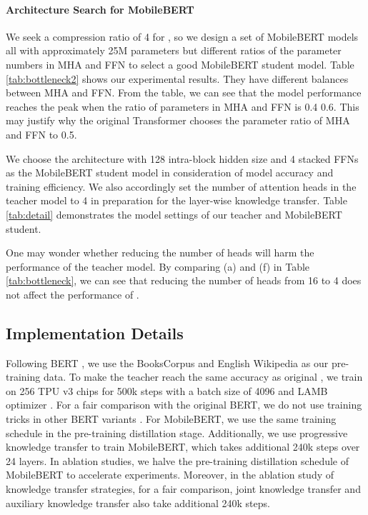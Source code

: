 \documentclass[11pt,a4paper]{article}
\begin{document}
\paragraph{Architecture Search for MobileBERT}

We seek a compression ratio of 4 for , so we design a set of MobileBERT models all with approximately 25M parameters but different ratios of the parameter numbers in MHA and FFN to select a good MobileBERT student model. Table \ref{tab:bottleneck2} shows our experimental results.
They have different balances between MHA and FFN. 
From the table, we can see that the model performance reaches the peak when the ratio of parameters in MHA and FFN is 0.4  0.6. This may justify why the original Transformer chooses the parameter ratio of MHA and FFN to 0.5. 

We choose the architecture with 128 intra-block hidden size and 4 stacked FFNs as the MobileBERT student model in consideration of model accuracy and training efficiency. We also accordingly set the number of attention heads in the teacher model to 4 in preparation for the layer-wise knowledge transfer. Table \ref{tab:detail} demonstrates the model settings of our  teacher and MobileBERT student.

One may wonder whether reducing the number of heads will harm the performance of the teacher model. By comparing (a) and (f) in Table \ref{tab:bottleneck}, we can see that reducing the number of heads from 16 to 4 does not affect the performance of .


\subsection{Implementation Details}

Following BERT \citep{devlin2018bert}, we use the BooksCorpus \citep{zhu2015aligning} and English Wikipedia as our pre-training data. To make the  teacher reach the same accuracy as original , we train  on 256 TPU v3 chips for 500k steps with a batch size of 4096 and LAMB optimizer \citep{you2019large}. For a fair comparison with the original BERT, we do not use training tricks in other BERT variants \citep{liu2019roberta,joshi2019spanbert}.
For MobileBERT, we use the same training schedule in the pre-training distillation stage. Additionally, we use progressive knowledge transfer to train MobileBERT, which takes additional 240k steps over 24 layers.
In ablation studies, we halve the pre-training distillation schedule of MobileBERT to accelerate experiments. Moreover, in the ablation study of knowledge transfer strategies, for a fair comparison, joint knowledge transfer and auxiliary knowledge transfer also take additional 240k steps.
\end{document}
